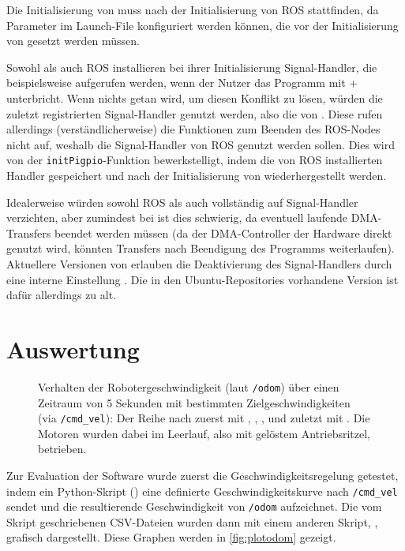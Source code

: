 \documentclass[german]{thesis_KBS}
\newcommand{\code}[1]{\texttt{#1}}  %
\begin{document}
Die Initialisierung von \pigpio{} muss nach der Initialisierung von ROS
stattfinden, da Parameter im Launch-File konfiguriert werden können, die vor der
Initialisierung von \pigpio{} gesetzt werden müssen.

Sowohl \pigpio{} als auch ROS installieren bei ihrer Initialisierung
Signal-Handler, die beispielsweise aufgerufen werden, wenn der Nutzer das
Programm mit \Ctrl+ unterbricht. Wenn nichts getan wird, um diesen
Konflikt zu lösen, würden die zuletzt registrierten Signal-Handler genutzt
werden, also die von \pigpio{}. Diese rufen allerdings (verständlicherweise) die
Funktionen zum Beenden des ROS-Nodes nicht auf, weshalb die Signal-Handler von
ROS genutzt werden sollen. Dies wird von der \code{initPigpio}-Funktion
bewerkstelligt, indem die von ROS installierten Handler gespeichert und nach der
Initialisierung von \pigpio{} wiederhergestellt werden.

Idealerweise würden sowohl ROS als auch \pigpio{} vollständig auf Signal-Handler
verzichten, aber zumindest bei \pigpio{} ist dies schwierig, da eventuell
laufende DMA-Transfers beendet werden müssen (da der DMA-Controller der Hardware
direkt genutzt wird, könnten Transfers nach Beendigung des Programms
weiterlaufen). Aktuellere Versionen von \pigpio{} erlauben die Deaktivierung des
Signal-Handlers durch eine interne Einstellung \cite{pigpio-sighandler}. Die in
den Ubuntu-Repositories vorhandene Version ist dafür allerdings zu alt.


\chapter{Auswertung}
\label{ch:evaluation}

\begin{figure}[hp]
    \hspace{-1.75cm} 
    \caption{
        Verhalten der Robotergeschwindigkeit (laut \code{/odom}) über einen
        Zeitraum von 5 Sekunden mit bestimmten Zielgeschwindigkeiten (via
        \code{/cmd\_vel}): Der Reihe nach zuerst mit ,
        , , und zuletzt mit
        . Die Motoren wurden dabei im Leerlauf, also mit
        gelöstem Antriebsritzel, betrieben.
    }
    \label{fig:plotodom}
\end{figure}

Zur Evaluation der Software wurde zuerst die Geschwindigkeitsregelung getestet,
indem ein Python-Skript () eine definierte
Geschwindigkeitskurve nach \code{/cmd\_vel} sendet und die resultierende
Geschwindigkeit von \code{/odom} aufzeichnet. Die vom Skript geschriebenen
CSV-Dateien wurden dann mit einem anderen Skript, ,
grafisch dargestellt. Diese Graphen werden in \autoref{fig:plotodom} gezeigt.
\end{document}
